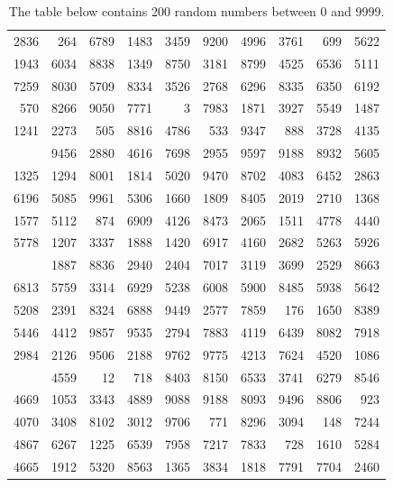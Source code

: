 \documentclass[
]{book}
\begin{document}
\begin{table}

\caption{\label{tab:A1}The table below contains 200 random numbers between 0 and 9999.}
\centering
\begin{tabular}[t]{rrrrrrrrrr}
\toprule
 &  &  &  &  &  &  &  &  & \\
\midrule
2836 & 264 & 6789 & 1483 & 3459 & 9200 & 4996 & 3761 & 699 & 5622\\
1943 & 6034 & 8838 & 1349 & 8750 & 3181 & 8799 & 4525 & 6536 & 5111\\
7259 & 8030 & 5709 & 8334 & 3526 & 2768 & 6296 & 8335 & 6350 & 6192\\
570 & 8266 & 9050 & 7771 & 3 & 7983 & 1871 & 3927 & 5549 & 1487\\
1241 & 2273 & 505 & 8816 & 4786 & 533 & 9347 & 888 & 3728 & 4135\\
\addlinespace
6688 & 9456 & 2880 & 4616 & 7698 & 2955 & 9597 & 9188 & 8932 & 5605\\
1325 & 1294 & 8001 & 1814 & 5020 & 9470 & 8702 & 4083 & 6452 & 2863\\
6196 & 5085 & 9961 & 5306 & 1660 & 1809 & 8405 & 2019 & 2710 & 1368\\
1577 & 5112 & 874 & 6909 & 4126 & 8473 & 2065 & 1511 & 4778 & 4440\\
5778 & 1207 & 3337 & 1888 & 1420 & 6917 & 4160 & 2682 & 5263 & 5926\\
\addlinespace
6635 & 1887 & 8836 & 2940 & 2404 & 7017 & 3119 & 3699 & 2529 & 8663\\
6813 & 5759 & 3314 & 6929 & 5238 & 6008 & 5900 & 8485 & 5938 & 5642\\
5208 & 2391 & 8324 & 6888 & 9449 & 2577 & 7859 & 176 & 1650 & 8389\\
5446 & 4412 & 9857 & 9535 & 2794 & 7883 & 4119 & 6439 & 8082 & 7918\\
2984 & 2126 & 9506 & 2188 & 9762 & 9775 & 4213 & 7624 & 4520 & 1086\\
\addlinespace
371 & 4559 & 12 & 718 & 8403 & 8150 & 6533 & 3741 & 6279 & 8546\\
4669 & 1053 & 3343 & 4889 & 9088 & 9188 & 8093 & 9496 & 8806 & 923\\
4070 & 3408 & 8102 & 3012 & 9706 & 771 & 8296 & 3094 & 148 & 7244\\
4867 & 6267 & 1225 & 6539 & 7958 & 7217 & 7833 & 728 & 1610 & 5284\\
4665 & 1912 & 5320 & 8563 & 1365 & 3834 & 1818 & 7791 & 7704 & 2460\\
\bottomrule
\end{tabular}
\end{table}
\end{document}
